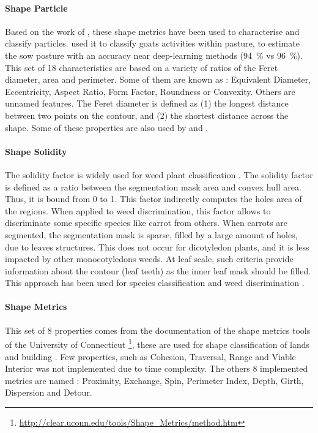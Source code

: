 \documentclass[../thesis.tex]{subfiles}
\begin{document}
    \paragraph{Shape Particle} Based on the work of \cite{hentschel2003selection}, these shape metrics have been used to characterise and classify particles. \cite{vayssade2019automatic} used it to classify goats activities within pasture, \cite{Bonneau2021} to estimate the sow posture with an accuracy near deep-learning methods (\SI{94}{\percent} vs \SI{96}{\percent}). This set of 18 characteristics are based on a variety of ratios of the Feret diameter, area and perimeter. Some of them are known as : Equivalent Diameter, Eccentricity, Aspect Ratio, Form Factor, Roundness or Convexity. Others are unnamed features. The Feret diameter is defined as (1) the longest distance between two points on the contour, and (2) the shortest distance across the shape. Some of these properties are also used by \cite{Lottes2016} and \cite{saha2017development}.
    
    \paragraph{Shape Solidity} The solidity factor is widely used for weed plant classification \cite{AHMED201298}. The solidity factor is defined as a ratio between the segmentation mask area and convex hull area. Thus, it is bound from 0 to 1. This factor indirectly computes the holes area of the regions. When applied to weed discrimination, this factor allows to discriminate some specific species like carrot from others. When carrots are segmented, the segmentation mask is sparse, filled by a large amount of holes, due to leaves structures. This does not occur for dicotyledon plants, and it is less impacted by other monocotyledons weeds. At leaf scale, such criteria provide information about the contour (leaf teeth) as the inner leaf mask should be filled. This approach has been used for species classification \cite{thyagharajan2019review} and weed discrimination \cite{Lottes2016}. 
    
    \paragraph{Shape Metrics} This set of 8 properties comes from the documentation of the shape metrics tools of the University of Connecticut \footnote{\url{http://clear.uconn.edu/tools/Shape_Metrics/method.htm}}, these are used for shape classification of lands \cite{angel2010ten} and building \cite{paszto2015shape}. Few properties, such as Cohesion, Traversal, Range and Viable Interior was not implemented due to time complexity. The others 8 implemented metrics are named : Proximity, Exchange, Spin, Perimeter Index, Depth, Girth, Dispersion and Detour.
    
\end{document}
